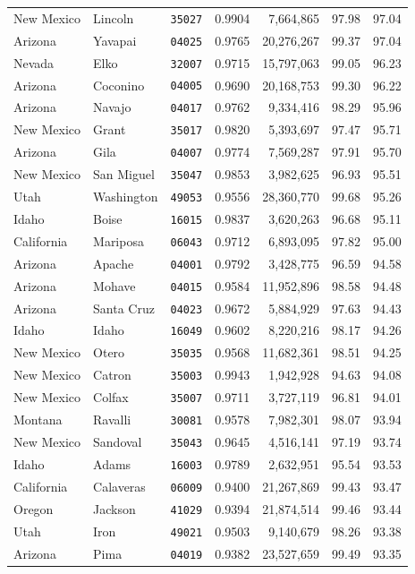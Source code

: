 \begin{longtable}{p{1.8cm} p{1.9cm} c r r r r}
New Mexico & Lincoln & \texttt{35027} & 0.9904 & 7,664,865 & 97.98 & 97.04 \\
Arizona & Yavapai & \texttt{04025} & 0.9765 & 20,276,267 & 99.37 & 97.04 \\
Nevada & Elko & \texttt{32007} & 0.9715 & 15,797,063 & 99.05 & 96.23 \\
Arizona & Coconino & \texttt{04005} & 0.9690 & 20,168,753 & 99.30 & 96.22 \\
Arizona & Navajo & \texttt{04017} & 0.9762 & 9,334,416 & 98.29 & 95.96 \\
New Mexico & Grant & \texttt{35017} & 0.9820 & 5,393,697 & 97.47 & 95.71 \\
Arizona & Gila & \texttt{04007} & 0.9774 & 7,569,287 & 97.91 & 95.70 \\
New Mexico & San Miguel & \texttt{35047} & 0.9853 & 3,982,625 & 96.93 & 95.51 \\
Utah & Washington & \texttt{49053} & 0.9556 & 28,360,770 & 99.68 & 95.26 \\
Idaho & Boise & \texttt{16015} & 0.9837 & 3,620,263 & 96.68 & 95.11 \\
California & Mariposa & \texttt{06043} & 0.9712 & 6,893,095 & 97.82 & 95.00 \\
Arizona & Apache & \texttt{04001} & 0.9792 & 3,428,775 & 96.59 & 94.58 \\
Arizona & Mohave & \texttt{04015} & 0.9584 & 11,952,896 & 98.58 & 94.48 \\
Arizona & Santa Cruz & \texttt{04023} & 0.9672 & 5,884,929 & 97.63 & 94.43 \\
Idaho & Idaho & \texttt{16049} & 0.9602 & 8,220,216 & 98.17 & 94.26 \\
New Mexico & Otero & \texttt{35035} & 0.9568 & 11,682,361 & 98.51 & 94.25 \\
New Mexico & Catron & \texttt{35003} & 0.9943 & 1,942,928 & 94.63 & 94.08 \\
New Mexico & Colfax & \texttt{35007} & 0.9711 & 3,727,119 & 96.81 & 94.01 \\
Montana & Ravalli & \texttt{30081} & 0.9578 & 7,982,301 & 98.07 & 93.94 \\
New Mexico & Sandoval & \texttt{35043} & 0.9645 & 4,516,141 & 97.19 & 93.74 \\
Idaho & Adams & \texttt{16003} & 0.9789 & 2,632,951 & 95.54 & 93.53 \\
California & Calaveras & \texttt{06009} & 0.9400 & 21,267,869 & 99.43 & 93.47 \\
Oregon & Jackson & \texttt{41029} & 0.9394 & 21,874,514 & 99.46 & 93.44 \\
Utah & Iron & \texttt{49021} & 0.9503 & 9,140,679 & 98.26 & 93.38 \\
Arizona & Pima & \texttt{04019} & 0.9382 & 23,527,659 & 99.49 & 93.35 \\

\end{longtable}



